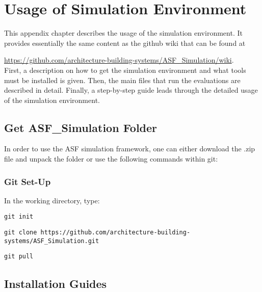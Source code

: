 
\chapter{Usage of Simulation Environment}\label{a:usage}

This appendix chapter describes the usage of the simulation environment. It provides essentially the same content as the github wiki that can be found at 

\url{https://github.com/architecture-building-systems/ASF_Simulation/wiki}.\\

First, a description on how to get the simulation environment and what tools must be installed is given. Then, the main files that run the evaluations are described in detail. Finally, a step-by-step guide leads through the detailed usage of the simulation environment. 

\section{Get ASF\_Simulation Folder}
\label{s:getFolder}
	
	In order to use the ASF simulation framework, one can either download the .zip file and unpack the folder or use the following commands within git:

	\subsection{Git Set-Up}

	In the working directory, type:

	\begin{verbatim}git init\end{verbatim}


	\begin{verbatim}git clone https://github.com/architecture-building-systems/ASF_Simulation.git\end{verbatim}


	\begin{verbatim}git pull\end{verbatim}
	
		
\section{Installation Guides}
\label{s:installation}

